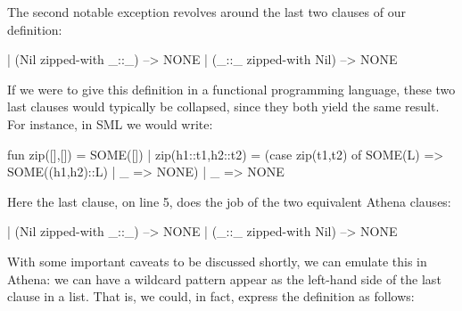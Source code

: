 The second notable exception revolves around the last two clauses
of our definition:
\begin{tcAthena}
     | (Nil zipped-with _::_) --> NONE
     | (_::_ zipped-with Nil) --> NONE 
\end{tcAthena}
If we were to give this definition in a functional programming 
language, these two last clauses would typically be collapsed, 
since they both yield the same result. For instance, in SML we would write:
\begin{tcAthena}
fun zip([],[]) = SOME([])
  | zip(h1::t1,h2::t2) = (case zip(t1,t2) of
                             SOME(L) => SOME((h1,h2)::L)
                           | _ => NONE)
  | _ => NONE
\end{tcAthena}
Here the last clause, on line 5, does the job of the two equivalent Athena clauses:
\begin{tcAthena}
     | (Nil zipped-with _::_) --> NONE
     | (_::_ zipped-with Nil) --> NONE 
\end{tcAthena}
With some important caveats to be discussed shortly, we can emulate
this in Athena: we can have a wildcard pattern \underscoresp appear 
as the left-hand side of the last clause in a  list. 
That is, we could, in fact, express the definition as follows: 
